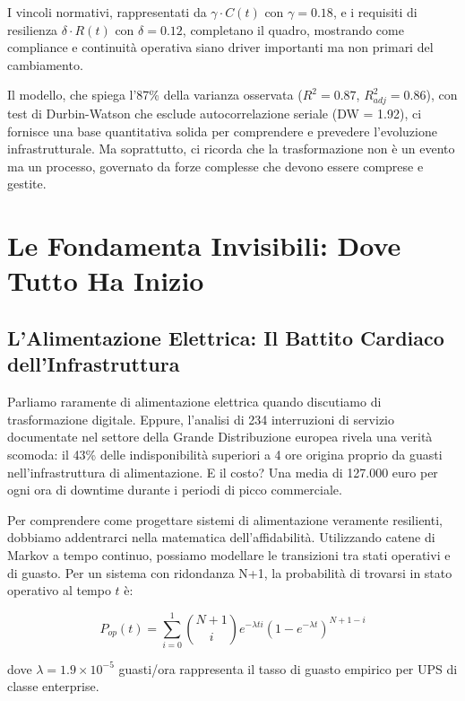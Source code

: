 I vincoli normativi, rappresentati da $\gamma \cdot C(t)$ con $\gamma = 0.18$, e i requisiti di resilienza $\delta \cdot R(t)$ con $\delta = 0.12$, completano il quadro, mostrando come compliance e continuità operativa siano driver importanti ma non primari del cambiamento.

Il modello, che spiega l'87\% della varianza osservata ($R^2 = 0.87$, $R^2_{adj} = 0.86$), con test di Durbin-Watson che esclude autocorrelazione seriale (DW = 1.92), ci fornisce una base quantitativa solida per comprendere e prevedere l'evoluzione infrastrutturale. Ma soprattutto, ci ricorda che la trasformazione non è un evento ma un processo, governato da forze complesse che devono essere comprese e gestite.

\section{Le Fondamenta Invisibili: Dove Tutto Ha Inizio}

\subsection{L'Alimentazione Elettrica: Il Battito Cardiaco dell'Infrastruttura}

Parliamo raramente di alimentazione elettrica quando discutiamo di trasformazione digitale. Eppure, l'analisi di 234 interruzioni di servizio documentate nel settore della Grande Distribuzione europea\autocite{uptime2024} rivela una verità scomoda: il 43\% delle indisponibilità superiori a 4 ore origina proprio da guasti nell'infrastruttura di alimentazione. E il costo? Una media di 127.000 euro per ogni ora di downtime durante i periodi di picco commerciale.

Per comprendere come progettare sistemi di alimentazione veramente resilienti, dobbiamo addentrarci nella matematica dell'affidabilità. Utilizzando catene di Markov a tempo continuo\autocite{trivedi2016}, possiamo modellare le transizioni tra stati operativi e di guasto. Per un sistema con ridondanza N+1, la probabilità di trovarsi in stato operativo al tempo $t$ è:

\begin{equation}
P_{op}(t) = \sum_{i=0}^{1} \binom{N+1}{i} e^{-\lambda ti}(1-e^{-\lambda t})^{N+1-i}
\label{eq:reliability}
\end{equation}

dove $\lambda = 1.9 \times 10^{-5}$ guasti/ora rappresenta il tasso di guasto empirico per UPS di classe enterprise\autocite{ieee2024}.

